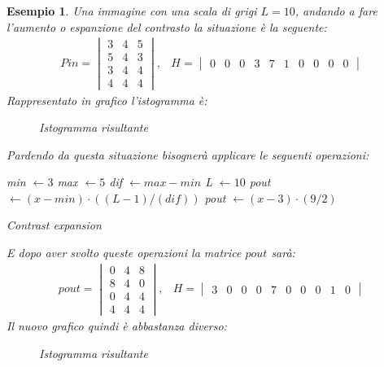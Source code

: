 \documentclass{report}
\newtheorem{esempio}{Esempio}[section]
\begin{document}
\begin{esempio}
  Una immagine con una scala di grigi $L=10$, andando a fare l'aumento o
  espanzione del contrasto la situazione è la seguente:
  \begin{eqnarray}
    \label{eq:cont-exp2}
    Pin =
    \begin{vmatrix}
      3 & 4 & 5 \\
      5 & 4 & 3 \\
      3 & 4 & 4 \\
      4 & 4 & 4
    \end{vmatrix}, & H =
    \begin{vmatrix}
      0 & 0 & 0 & 3 & 7 & 1 & 0 & 0 & 0 & 0  
    \end{vmatrix}
  \end{eqnarray}
  Rappresentato in grafico l'istogramma è:
  \begin{figure}[ht!]
    \centering
    \caption{Istogramma risultante}
    \label{fig:calc-isto}
  \end{figure}
  Pardendo da questa situazione bisognerà applicare le seguenti operazioni:
  \begin{algorithm}
    min $\gets 3$\;
    max $\gets 5$\;
    dif $\gets max-min$\;
    L $\gets 10$\;
    pout $\gets (x-min)\cdot((L-1)/(dif))$\;
    pout $\gets (x-3)\cdot(9/2)$\;
    \caption{Contrast expansion}
  \end{algorithm}
  
  E dopo aver svolto queste operazioni la matrice $pout$ sarà:
  \begin{eqnarray}
    \label{eq:cont-exp3}
    pout =
    \begin{vmatrix}
      0 & 4 & 8 \\
      8 & 4 & 0 \\
      0 & 4 & 4 \\
      4 & 4 & 4
    \end{vmatrix}, & H=
                     \begin{vmatrix}
                       3 & 0 & 0 & 0 & 7 & 0 & 0 & 0 & 1 & 0 
                     \end{vmatrix}
  \end{eqnarray}
  Il nuovo grafico quindi è abbastanza diverso:
  \begin{figure}[ht!]
    \centering
    \caption{Istogramma risultante}
    \label{fig:calc-isto}
  \end{figure}
  

\end{esempio}
\end{document}
